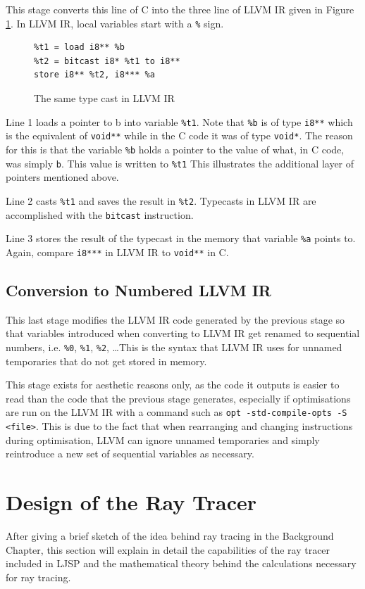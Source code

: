 \documentclass[11pt]{report}
\begin{document}
This stage converts this line of C into the three line of LLVM IR given in Figure \ref{convllvmir2}. In LLVM IR, local variables start with a \texttt{\%} sign. 

\begin{figure}[ht]
\begin{lstlisting}
%t1 = load i8** %b
%t2 = bitcast i8* %t1 to i8**
store i8** %t2, i8*** %a
\end{lstlisting}
\caption{The same type cast in LLVM IR}
\label{convllvmir2}
\end{figure}

Line 1 loads a pointer to b into variable \texttt{\%t1}. Note that \texttt{\%b} is of type \texttt{i8**} which is the equivalent of \texttt{void**} while in the C code it was of type \texttt{void*}. The reason for this is that the variable \texttt{\%b} holds a pointer to the value of what, in C code, was simply \texttt{b}. This value is written to \texttt{\%t1} This illustrates the additional layer of pointers mentioned above.

Line 2 casts \texttt{\%t1} and saves the result in \texttt{\%t2}. Typecasts in LLVM IR are accomplished with the \texttt{bitcast} instruction.

Line 3 stores the result of the typecast in the memory that variable \texttt{\%a} points to. Again, compare \texttt{i8***} in LLVM IR to \texttt{void**} in C.

\subsection{Conversion to Numbered LLVM IR}
This last stage modifies the LLVM IR code generated by the previous stage so that variables introduced when converting to LLVM IR get renamed to sequential numbers, i.e. \texttt{\%0}, \texttt{\%1}, \texttt{\%2}, \dots This is the syntax that LLVM IR uses for unnamed temporaries that do not get stored in memory.

This stage exists for aesthetic reasons only, as the code it outputs is easier to read than the code that the previous stage generates, especially if optimisations are run on the LLVM IR with a command such as \texttt{opt -std-compile-opts -S <file>}. This is due to the fact that when rearranging and changing instructions during optimisation, LLVM can ignore unnamed temporaries and simply reintroduce a new set of sequential variables as necessary. 

\section{Design of the Ray Tracer}
After giving a brief sketch of the idea behind ray tracing in the Background Chapter, this section will explain in detail the capabilities of the ray tracer included in LJSP and the mathematical theory behind the calculations necessary for ray tracing.
\end{document}
